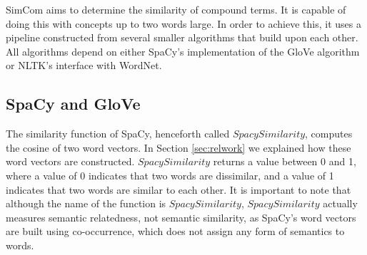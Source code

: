 \documentclass{article}
\begin{document}
SimCom aims to determine the similarity of compound terms. It is capable of doing this with concepts up to two words large. In order to achieve this, it uses a pipeline constructed from several smaller algorithms that build upon each other. All algorithms depend on either SpaCy's implementation of the GloVe algorithm or NLTK's interface with WordNet.

\subsection{SpaCy and GloVe}
The similarity function of SpaCy, henceforth called $\textit{SpacySimilarity}$, computes the cosine of two word vectors. In Section \ref{sec:relwork} we explained how these word vectors are constructed. $\textit{SpacySimilarity}$ returns a value between 0 and 1, where a value of 0 indicates that two words are dissimilar, and a value of 1 indicates that two words are similar to each other. It is important to note that although the name of the function is $\textit{SpacySimilarity}$, $\textit{SpacySimilarity}$ actually measures semantic relatedness, not semantic similarity, as SpaCy's word vectors are built using co-occurrence, which does not assign any form of semantics to words. 
\end{document}
